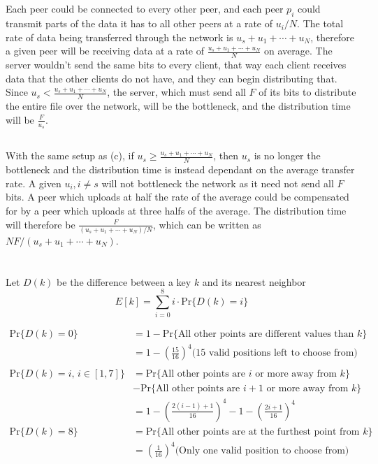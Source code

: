 \documentclass[12pt]{article}
\begin{document}
\subsection{}
Each peer could be connected to every other peer, and each peer $p_i$ could
transmit parts of the data it has to all other peers at a rate of $u_i/N$.  The
total rate of data being transferred through the network is $u_s + u_1 + \cdots
+ u_N$, therefore a given peer will be receiving data at a rate of $\frac{u_s +
u_1 + \cdots + u_N}{N}$ on average.  The server wouldn't send the same bits to
every client, that way each client receives data that the other clients do not
have, and they can begin distributing that.  Since $u_s < \frac{u_s + u_1 +
\cdots + u_N}{N}$, the server, which must send all $F$ of its bits to distribute
the entire file over the network, will be the bottleneck, and the distribution
time will be $\frac{F}{u_s}$.

\subsection{}
With the same setup as (c), if $u_s \geq \frac{u_s + u_1 + \cdots + u_N}{N}$,
then $u_s$ is no longer the bottleneck and the distribution time is instead
dependant on the average transfer rate.  A given $u_i, i \neq s$ will not
bottleneck the network as it need not send all $F$ bits.  A peer which
uploads at half the rate of the average could be compensated for by a peer which
uploads at three halfs of the average.  The distribution time will therefore be
$\frac{F}{(u_s + u_1 + \cdots + u_N)/N}$, which can be written as $NF/(u_s+u_1+
\cdots+u_N)$.

\section{}

Let $D(k)$ be the difference between a key $k$ and its nearest neighbor
$$E[k] = \sum_{i = 0}^8 i \cdot \text{Pr}\{D(k) = i\}$$

$$\begin{aligned}
    \text{Pr}\{D(k) = 0\} &= 1 - \text{Pr}\{\text{All other points are different values than $k$}\}\\
    &= 1 - \left(\frac{15}{16}\right)^4 \text{(15 valid positions left to choose from)}\\
    \\
    \text{Pr}\{D(k) = i\text{, $i \in [1, 7]$}\} &= \text{Pr}\{\text{All other points are $i$ or more away from $k$}\}\\ 
                                                 &- \text{Pr}\{\text{All other points are $i + 1$ or more away from $k$}\}\\
    &= 1 - \left(\frac{2(i - 1) + 1}{16}\right)^4 - 1 - \left(\frac{2i + 1}{16}\right)^4\\ 
    \text{Pr}\{D(k) = 8\} &= \text{Pr}\{\text{All other points are at the furthest point from $k$}\}\\
    &= \left(\frac{1}{16}\right)^4 \text{(Only one valid position to choose from)}\\
\end{aligned}
$$
\end{document}
